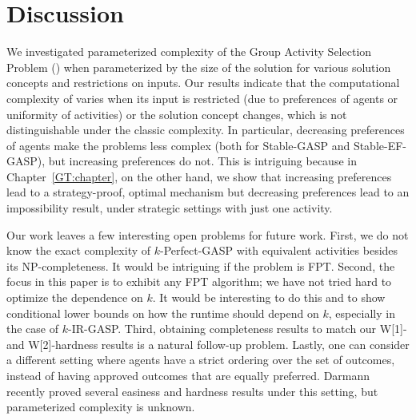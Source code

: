 \section{Discussion} \label{GASP:sec:discussion}





We investigated parameterized complexity of the Group Activity Selection Problem (\GASP) when parameterized by the size of the solution for various solution concepts and restrictions on inputs.
Our results indicate that the computational complexity of \GASPs varies when its input is restricted (due to preferences of agents or uniformity of activities) or the solution concept changes, which is not distinguishable under the classic complexity. In particular, decreasing preferences of agents make the problems less complex (both for Stable-GASP and Stable-EF-GASP), but increasing preferences do not. This is intriguing because in Chapter~\ref{GT:chapter}, on the other hand, we show that increasing preferences lead to a strategy-proof, optimal mechanism but decreasing preferences lead to an impossibility result, under strategic settings with just one activity.

Our work leaves a few interesting open problems for future work. 
First, we do not know the exact complexity of $k$-Perfect-GASP with equivalent activities besides its NP-completeness. It would be intriguing if the problem is FPT.
Second, the focus in this paper is to exhibit any FPT algorithm; we have not tried hard to optimize the dependence on $k$. It would be interesting to do this and to show conditional lower bounds on how the runtime should depend on $k$, especially in the case of $k$-IR-GASP. 
Third, obtaining completeness results to match our W[1]- and W[2]-hardness results is a natural follow-up problem.
Lastly, one can consider a different setting where agents have a strict ordering over the set of outcomes, instead of having approved outcomes that are equally preferred. Darmann~\cite{DARMANN15ADT} recently proved several easiness and hardness results under this setting, but parameterized complexity is unknown.

